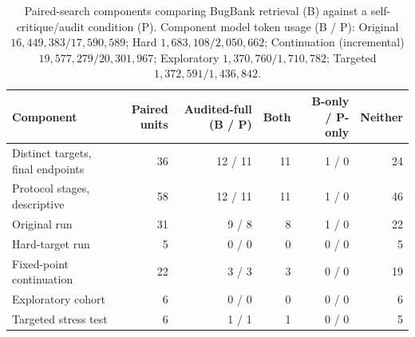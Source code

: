 \begin{table}[htbp]
\centering\small
\begin{tabular}{lrrrrr}
\toprule
Component & Paired units & Audited-full (B / P) & Both & B-only / P-only & Neither \\
\midrule
Distinct targets, final endpoints & 36 & 12 / 11 & 11 & 1 / 0 & 24 \\
Protocol stages, descriptive & 58 & 12 / 11 & 11 & 1 / 0 & 46 \\
\midrule
Original run & 31 & 9 / 8 & 8 & 1 / 0 & 22 \\
Hard-target run & 5 & 0 / 0 & 0 & 0 / 0 & 5 \\
Fixed-point continuation & 22 & 3 / 3 & 3 & 0 / 0 & 19 \\
Exploratory cohort & 6 & 0 / 0 & 0 & 0 / 0 & 6 \\
Targeted stress test & 6 & 1 / 1 & 1 & 0 / 0 & 5 \\
\bottomrule
\end{tabular}
\caption{Paired-search components comparing BugBank retrieval (B) against a self-critique/audit condition (P). Component model token usage (B / P): Original $16{,}449{,}383 / 17{,}590{,}589$; Hard $1{,}683{,}108 / 2{,}050{,}662$; Continuation (incremental) $19{,}577{,}279 / 20{,}301{,}967$; Exploratory $1{,}370{,}760 / 1{,}710{,}782$; Targeted $1{,}372{,}591 / 1{,}436{,}842$.}
\label{tab:historical_retrieval}
\end{table}
